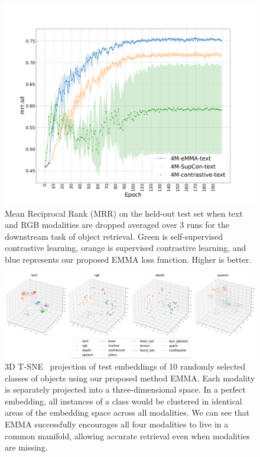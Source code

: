 \documentclass[sigconf,natbib=true,anonymous=true]{acmart}
\begin{document}
\begin{figure}[tbh]
\centering
\includegraphics[width=.99\columnwidth]{Figures/average-seeds-epochs-mrr_ad.pdf}
\caption{Mean Reciprocal Rank (MRR) on the held-out test set when text and RGB modalities are dropped averaged over 3 runs for the downstream task of object retrieval.  Green is self-supervised contrastive learning, orange is supervised contrastive learning, and blue represents our proposed EMMA loss function. Higher is better.
}
\label{fig:epochs-mrr.sd}
\end{figure}

\begin{figure}[tbh]
\centering
\includegraphics[width=1.99\columnwidth]{Figures/3D-tsne-4M-eMMA-cosine-submodalities-text-anchor-gold-no_neg_sampling-1024-sbs.png}
\caption{3D T-SNE~\cite{van2008tsne} projection of test embeddings of 10 randomly selected classes of objects using our proposed method EMMA. Each modality is separately projected into a three-dimensional space. In a perfect embedding, all instances of a class would be clustered in identical areas of the embedding space across all modalities. We can see that EMMA successfully encourages all four modalities to live in a common manifold, allowing accurate retrieval even when modalities are missing. 
}
\label{fig:3d-tsne}
\end{figure}
\end{document}
